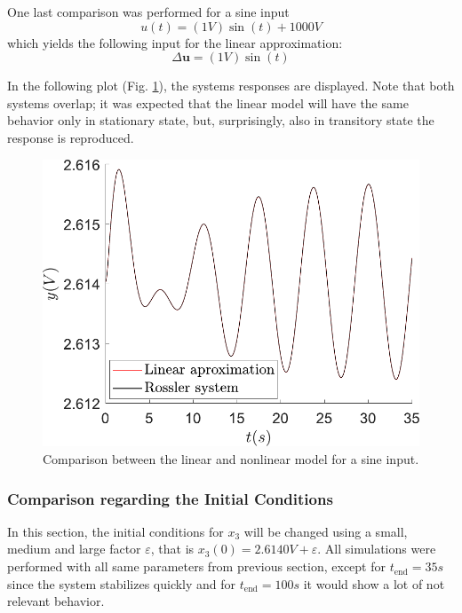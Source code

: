 One last comparison was performed for a sine input
\begin{equation}
    u(t)=(1V)\sin(t) + 1000V
\end{equation} which yields the following input for the linear approximation:
\begin{equation}
    \Delta\mathbf{u}=(1V)\sin(t)
\end{equation}

In the following plot (Fig. \ref{fig:sinInput_compar}), the systems responses are displayed. Note that both systems overlap; it was expected that the linear model will have the same behavior only in stationary state, but, surprisingly, also in transitory state the response is reproduced.
\begin{figure}[ht]
    \centering
    \includegraphics[scale=0.5]{figs/comparLinearVSNonlinear/Entrada_seno_lineal_no_lineal.pdf}
    \caption{Comparison between the linear and nonlinear model for a sine input.}
    \label{fig:sinInput_compar}
\end{figure}


\subsubsection{Comparison regarding the Initial Conditions} \label{sec:initCondCompar}
In this section, the initial conditions for $x_3$ will be changed using a small, medium and large factor $\varepsilon$, that is $x_3(0)=2.6140V+\varepsilon$. All simulations were performed with all same parameters from previous section, except for $t_{\text{end}}=35s$ since the system stabilizes quickly and for $t_{\text{end}}=100s$ it would show a lot of not relevant behavior.

